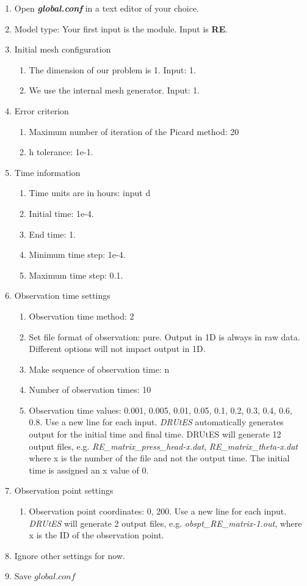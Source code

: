 \documentclass[
10pt, %
a4paper, %
oneside, %
headinclude,footinclude, %
BCOR5mm, %
]{scrartcl}
\begin{document}
\begin{enumerate}
\item Open \textbf{\emph{global.conf}} in a text editor of your choice. 
\item Model type: Your first input is the module. Input is \textbf{RE}.
\item Initial mesh configuration \begin{enumerate}
\item The dimension of our problem is 1. Input: 1.
\item We use the internal mesh generator. Input: 1. 
\end{enumerate}
\item Error criterion \begin{enumerate} 
\item Maximum number of iteration of the Picard method: 20 
\item h tolerance: 1e-1.
\end{enumerate}
\item Time information 
\begin{enumerate} 
\item Time units are in hours: input d
\item Initial time: 1e-4.
\item End time: 1.
\item Minimum time step: 1e-4.
\item Maximum time step: 0.1.
\end{enumerate}
\item Observation time settings \begin{enumerate}
\item Observation time method: 2
\item Set file format of observation: pure. Output in 1D is always in raw data. Different options will not impact output in 1D.
\item Make sequence of observation time: n
\item Number of observation times: 10
\item Observation time values: 0.001,
0.005,
0.01,
0.05,
0.1,
0.2,
0.3,
0.4,
0.6,
0.8. Use a new line for each input. \textit{DRUtES} automatically generates output for the initial time and final time. DRUtES will generate 12 output files, e.g. \textit{RE\_matrix\_press\_head-x.dat}, \textit{RE\_matrix\_theta-x.dat} where x is the number of the file and not the output time. The initial time is assigned an x value of 0. 
\end{enumerate}
\item Observation point settings \begin{enumerate}
\item Observation point coordinates: 0, 200. Use a new line for each input. \textit{DRUtES} will generate 2 output files, e.g. \textit{obspt\_RE\_matrix-1.out}, where x is the ID of the observation point. 
\end{enumerate}
\item Ignore other settings for now. 
\item Save $global.conf$
\end{enumerate}
\end{document}

